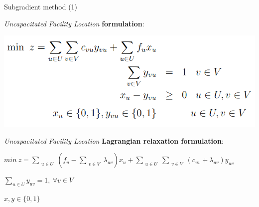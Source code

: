 \documentclass{beamer}
\begin{document}
	    \begin{frame}{Subgradient method (1)}
	        
	        \textit{Uncapacitated Facility Location} \textbf{formulation}:
	             \begin{center}
               
                \includegraphics[width=.85\textwidth]{img/algo_1.png}
        	     \end{center}
        	     
        	  \textit{Uncapacitated Facility Location} \textbf{Lagrangian relaxation formulation}:
        	     \begin{center}
        	         
        	         $min \ z = \sum_{\substack{u \in U}} (f_u - \sum_{\substack{v \in V}} \lambda_{uv}) x_u + \sum_{\substack{u \in U}} \sum_{\substack{v \in V}} (c_{uv} + \lambda_{uv}) y_{uv}$
        	         

        	         $\sum_{u \in U} y_{uv} = 1, \ \forall v \in V$
        	         
        	         $x, y \in \{0,1\}$
        	     \end{center}
	    \end{frame}
    
\end{document}
